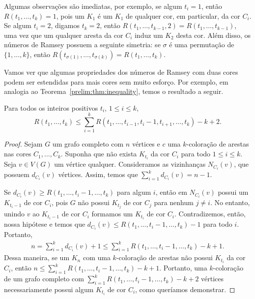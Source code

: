 Algumas observações são imediatas, por exemplo, se algum $t_i = 1$, então $R(t_1, \dots, t_k) = 1$, pois um $K_1$ é um $K_1$ de qualquer cor, em particular, da cor $C_i$. Se algum $t_i = 2$, digamos $t_k = 2$, então $R(t_1, \dots, t_{k-1}, 2) = R(t_1, \dots, t_{k-1})$, uma vez que um qualquer aresta da cor $C_i$ induz um $K_2$ desta cor. Além disso, os números de Ramsey possuem a seguinte simetria: se $\sigma$ é uma permutação de $\{1, \dots, k\}$, então
$R(t_{\sigma(1)}, \dots, t_{\sigma(k)}) = R(t_1, \dots, t_k)$.

Vamos ver que algumas propriedades dos números de Ramsey com duas cores podem ser estendidas para mais cores sem muito esforço. Por exemplo, em analogia ao Teorema~\ref{prelim:thm:inequality}, temos o resultado a seguir.

\begin{theorem}
\label{prelim:thm:multi_inequality}
Para todos os inteiros positivos $t_i$, $1 \leq i \leq k$,
\[ R(t_1, \dots, t_k) \leq \sum_{i=1}^{k} R(t_1, \dots,t_{i-1}, t_i - 1, t_{i+1}, \dots, t_k) - k + 2. \]
\end{theorem}
\begin{proof}
Sejam $G$ um grafo completo com $n$ vértices e $c$ uma $k$-coloração de arestas nas cores $C_1, \dots, C_k$. Suponha que não exista $K_{t_i}$ da cor $C_i$ para todo $1 \leq i \leq k$. Seja $v \in V(G)$ um vértice qualquer. Consideramos as vizinhanças $N_{C_i}(v)$, que possuem $d_{C_i}(v)$ vértices. Assim, temos que $\sum_{i=1}^{k} d_{C_i}(v) = n-1$.

Se $d_{C_i}(v) \geq R(t_1, \dots, t_i - 1, \dots, t_k)$ para algum $i$, então em $N_{C_i}(v)$ possui um $K_{t_i - 1}$ de cor $C_i$, pois $G$ não possui $K_{t_j}$ de cor $C_j$ para nenhum $j \neq i$. No entanto, unindo $v$ ao $K_{t_i - 1}$ de cor $C_i$ formamos um $K_{t_i}$ de cor $C_i$.
Contradizemos, então, nossa hipótese e temos que $d_{C_i}(v) \leq R(t_1, \dots, t_i - 1, \dots, t_k) - 1$ para todo $i$. Portanto,
\begin{align*}
n = \sum_{i=1}^{k} d_{C_i}(v)  + 1 \leq \sum_{i=1}^{k} R(t_1, \dots, t_i - 1, \dots, t_k) - k + 1.
\end{align*}
Dessa maneira, se um $K_n$ com uma $k$-coloração de arestas não possui $K_{t_i}$ da cor $C_i$, então $n \leq \sum_{i=1}^{k} R(t_1, \dots, t_i - 1, \dots, t_k) - k + 1$. Portanto, uma $k$-coloração de um grafo completo com $\sum_{i=1}^{k} R(t_1, \dots, t_i - 1, \dots, t_k) - k + 2$ vértices necessariamente possui algum $K_{t_i}$ de cor $C_i$, como queríamos demonstrar.
\end{proof}

